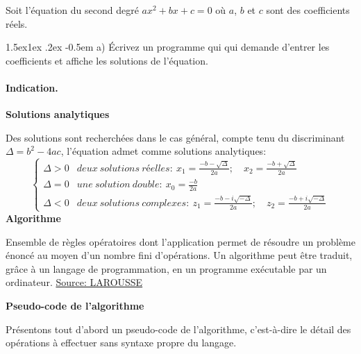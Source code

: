 \documentclass[%
oneside,                 %
final,                   %
10pt,french]{article}
\makeatletter
\newenvironment{blockshaded}
{\def\FrameCommand{\fboxsep=3mm\colorbox{grayicon_block_background}}
 \MakeFramed {\advance\hsize-\width \FrameRestore}}{\endMakeFramed}
\newenvironment{block_grayiconadmon}[1][Block]{
\begin{blockshaded}
\noindent
 \textbf{#1}\par
\nobreak\noindent\ignorespaces
}
{
\end{blockshaded}
}
\newenvironment{doconceexercise}{}{}
\newcounter{doconceexercisecounter}
\newcommand\subex{\@startsection{paragraph}{4}{\z@}%
                  {1.5ex\@plus1ex \@minus.2ex}%
                  {-0.5em}%
                  {\normalfont\normalsize\bfseries}}
\makeatother
\begin{document}
\begin{doconceexercise}



Soit l’équation du second degré $a x^2 + bx + c = 0$ où $a$, $b$ et $c$ sont des coefficients réels.


\subex{a)}
Écrivez un programme qui  qui demande d'entrer les coefficients et affiche les solutions de l'équation.


\paragraph{Indication.}
\textbf{Solutions analytiques}

Des solutions sont recherchées dans le cas général, compte tenu du discriminant $\Delta = b^2 - 4ac$, l'équation admet comme solutions analytiques:
\[  \left\{
\begin{array}{ll}
\Delta > 0 & deux \ solutions \ réelles : \ x_1 = \frac{-b - \sqrt{\Delta}}{2a}; \quad x_2 =  \frac{-b + \sqrt{\Delta}}{2a}\\
\Delta = 0 & une \ solution \ double : \ x_0 = \frac{-b}{2a} \\
\Delta < 0 & deux \ solutions \ complexes : \ z_1 = \frac{-b - i \sqrt{-\Delta}}{2a}; \quad z_2 = \frac{-b + i \sqrt{-\Delta}}{2a}
\end{array}
\right. \]
\textbf{Algorithme}


\begin{block_grayiconadmon}[Définition]
 Ensemble de règles opératoires dont l'application permet de résoudre un problème énoncé au moyen d'un nombre fini d'opérations. Un algorithme peut être traduit, grâce à un langage de programmation, en un programme exécutable par un ordinateur.
\href{{https://www.larousse.fr/dictionnaires/francais/algorithme/2238}}{Source: LAROUSSE}
\end{block_grayiconadmon} %



\textbf{Pseudo-code de l'algorithme}

 Présentons tout d'abord un pseudo-code de l'algorithme, c'est-à-dire le détail des opérations à effectuer sans syntaxe propre du langage.


\vspace{6mm}


\end{doconceexercise}
\end{document}
